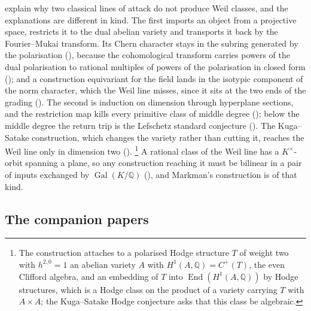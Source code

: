 \documentclass[11pt,reqno]{amsart}
\theoremstyle{plain}
\theoremstyle{definition}
\theoremstyle{remark}
\newcommand{\QQ}{\mathbb{Q}}
\DeclareMathOperator{\End}{End}
\DeclareMathOperator{\Gal}{Gal}
\newcommand{\Kx}{K^{\times}}
\begin{document}
 explain why two classical lines of attack do not
produce Weil classes, and the explanations are different in kind. The first
imports an object from a projective space, restricts it to the dual abelian
variety and transports it back by the Fourier--Mukai transform. Its Chern
character stays in the subring generated by the polarisation
(), because the cohomological transform carries powers of
the dual polarisation to rational multiples of powers of the polarisation in
closed form (); and a construction equivariant for the
field lands in the isotypic component of the norm character, which the Weil
line misses, since it sits at the two ends of the grading
(). The second is induction on dimension through
hyperplane sections, and the restriction map kills every primitive class of
middle degree (); below the middle degree the return
trip is the Lefschetz standard conjecture (). The
Kuga--Satake construction, which changes the variety rather than cutting it,
reaches the Weil line only in dimension two ().%
\footnote{The construction attaches to a polarised Hodge structure $T$ of
weight two with $h^{2,0}=1$ an abelian variety $A$ with
$H^{1}(A,\QQ)=C^{+}(T)$, the even Clifford algebra, and an embedding of
$T$ into $\End(H^{1}(A,\QQ))$ by Hodge structures, which is a Hodge class on
the product of a variety carrying $T$ with $A\times A$; the Kuga--Satake
Hodge conjecture asks that this class be algebraic.} A rational
class of the Weil line has a $\Kx$-orbit spanning a plane, so any
construction reaching it must be bilinear in a pair of inputs exchanged by
$\Gal(K/\QQ)$ (), and Markman's construction is of that
kind.


\subsection{The companion papers}
\end{document}
